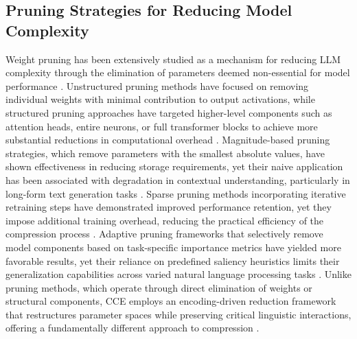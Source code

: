 \subsection{Pruning Strategies for Reducing Model Complexity}
Weight pruning has been extensively studied as a mechanism for reducing LLM complexity through the elimination of parameters deemed non-essential for model performance \cite{ huso2023binary}. Unstructured pruning methods have focused on removing individual weights with minimal contribution to output activations, while structured pruning approaches have targeted higher-level components such as attention heads, entire neurons, or full transformer blocks to achieve more substantial reductions in computational overhead \cite{ stefanov2024contextual}. Magnitude-based pruning strategies, which remove parameters with the smallest absolute values, have shown effectiveness in reducing storage requirements, yet their naive application has been associated with degradation in contextual understanding, particularly in long-form text generation tasks \cite{vima2024enhancing}. Sparse pruning methods incorporating iterative retraining steps have demonstrated improved performance retention, yet they impose additional training overhead, reducing the practical efficiency of the compression process \cite{navjord2023beyond}. Adaptive pruning frameworks that selectively remove model components based on task-specific importance metrics have yielded more favorable results, yet their reliance on predefined saliency heuristics limits their generalization capabilities across varied natural language processing tasks \cite{santos2024adaptive}. Unlike pruning methods, which operate through direct elimination of weights or structural components, CCE employs an encoding-driven reduction framework that restructures parameter spaces while preserving critical linguistic interactions, offering a fundamentally different approach to compression \cite{chester2024contextual}.

